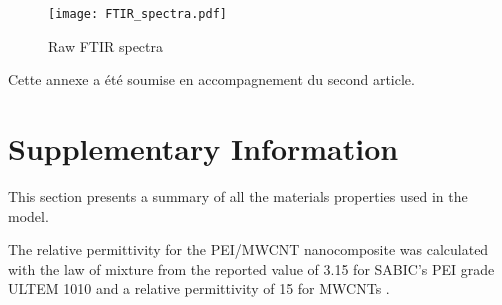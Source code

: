 \begin{figure}[h!]
	\center
	\texttt{[image: FTIR\_spectra.pdf]}
	\caption{Raw FTIR spectra \cite{Brassard2018_figshare_article1}}
	\label{fig:FTIR_spectra}
\end{figure}


Cette annexe a été soumise en accompagnement du second article. 

\section*{Supplementary Information}

This section presents a summary of all the materials properties used in the model. 

The relative permittivity for the PEI/MWCNT nanocomposite was calculated with the law of mixture from the reported value of 3.15 for SABIC’s PEI grade ULTEM 1010 and a relative permittivity of 15 for MWCNTs \cite{Katsounaros2011}. 

